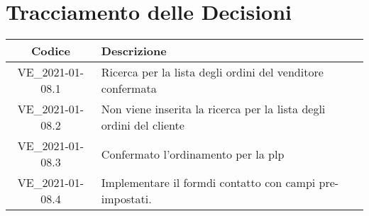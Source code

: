 \section*{Tracciamento delle Decisioni}

\begin{center}
	\begin{longtable}{|c|p{11.5cm}|}
	\hline
	\rowcolor{lighter-grayer}
	\textbf{Codice} & \textbf{Descrizione} \\
	\hline
	\endfirsthead

	\hline
	VE\_2021-01-08.1 & Ricerca per la lista degli ordini del venditore confermata \\
	VE\_2021-01-08.2 & Non viene inserita la ricerca per la lista degli ordini del cliente \\
	VE\_2021-01-08.3 & Confermato l'ordinamento per la plp \\
	VE\_2021-01-08.4 & Implementare il formdi contatto con campi pre-impostati. \\
	\hline

	\end{longtable}
\end{center}